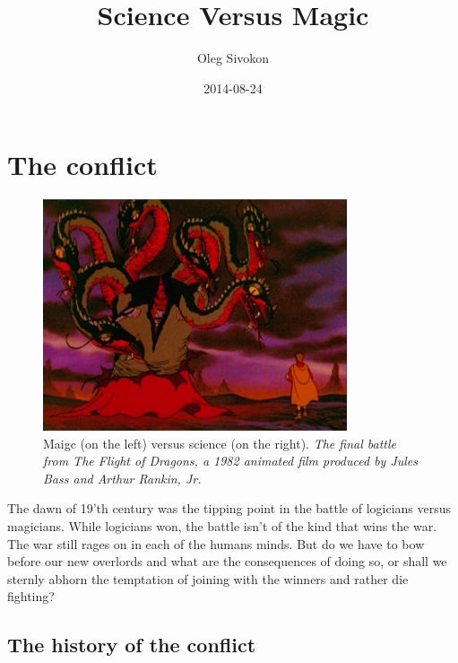 \documentclass[11pt]{article}
\author{Oleg Sivokon}
\date{2014-08-24}
\title{Science Versus Magic}
\begin{document}
\maketitle
\tableofcontents


\newpage

\section{The conflict}
\label{sec-1}

\begin{figure}[h!]
  \centering
  \includegraphics[width=0.8\textwidth]{./the-flight-of-dragons.png}
  \caption[Magic vs Science]{
    \ssmall Maigc (on the left) versus science (on the right).
    \textit{The final battle from The Flight of Dragons,
      a 1982 animated film produced by Jules Bass and Arthur Rankin, Jr.}}
\end{figure}

The dawn of 19'th century was the tipping point in the battle of logicians
versus magicians.  While logicians won, the battle isn't of the kind that wins
the war.  The war still rages on in each of the humans minds.  But do we have
to bow before our new overlords and what are the consequences of doing so, or
shall we sternly abhorn the temptation of joining with the winners and rather
die fighting?

\subsection{The history of the conflict}
\label{sec-1-1}
\end{document}
